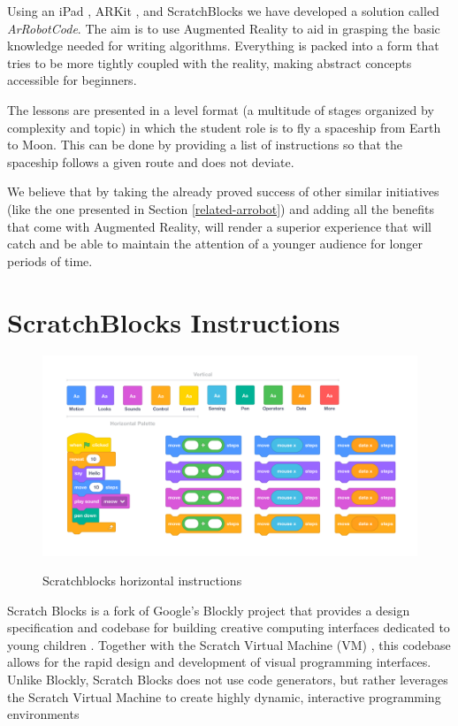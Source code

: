 \documentclass[12 pct]{report}
\begin{document}
Using an iPad \cite{henderson2012ipad}, ARKit \cite{wang2018understanding}, and ScratchBlocks \cite{resnick2009scratch} we have developed a solution called \textit{ArRobotCode}.
The aim is to use Augmented Reality to aid in grasping the basic knowledge needed for writing algorithms. 
Everything is packed into a form that tries to be more tightly coupled with the reality, making abstract concepts accessible for beginners.

The lessons are presented in a level format (a multitude of stages organized by complexity and topic) in which the student role is to fly a spaceship from Earth to Moon. 
This can be done by providing a list of instructions so that the spaceship follows a given route and does not deviate.

We believe that by taking the already proved success of other similar initiatives (like the one presented in Section \ref{related-arrobot}) and adding all the benefits that come with Augmented Reality, will render a superior experience that will catch and be able to maintain the attention of a younger audience for longer periods of time.


\section{ScratchBlocks Instructions}
\begin{figure}[H]
\includegraphics[width=1.0\textwidth]{scratchblocks-2}
\centering
\label{fig:hololens}
\caption{Scratchblocks horizontal instructions}
\end{figure}

Scratch Blocks is a fork of Google's Blockly project \cite{fraser2014google} that provides a design specification and codebase for building creative computing interfaces dedicated to young children \cite{resnick2009scratch}. 
Together with the Scratch Virtual Machine (VM) \cite{scratchvm}, this codebase allows for the rapid design and development of visual programming interfaces. 
Unlike Blockly, Scratch Blocks does not use code generators, but rather leverages the Scratch Virtual Machine to create highly dynamic, interactive programming environments
\end{document}
